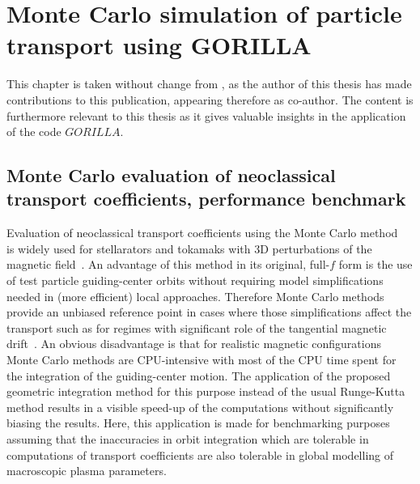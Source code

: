 \documentclass[./main.tex]{subfiles}
\begin{document}
\chapter{Monte Carlo simulation of particle transport using GORILLA}
This chapter is taken without change from \cite{paper_gorilla}, as the author of this thesis has made contributions to this publication, appearing therefore as co-author. The content is furthermore relevant to this thesis as it gives valuable insights in the application of the code $GORILLA$.
\section{Monte Carlo evaluation of neoclassical transport coefficients, performance benchmark}
\label{sec:transport}


Evaluation of neoclassical transport coefficients using the Monte Carlo
method~\cite{boozer_monte_1981,lotz_monte_1988} is widely
used for stellarators and tokamaks with 3D perturbations of the magnetic
field~\cite{wakasa_study_2008,tribaldos_monte_2001,isaev_venusf_2006,allmaier_variance_2008,velasco_calculation_2011,satake_neoclassical_2011,pfefferle_venus-levis_2014}.
An advantage of this method in its original, full-$f$ form is the use of test particle guiding-center
orbits without requiring model simplifications needed in (more efficient) local approaches. Therefore Monte Carlo methods provide
an unbiased reference point in cases where those simplifications affect the transport such as for regimes with
significant role of the tangential magnetic drift~\cite{matsuoka_effects_2015,huang_benchmark_2017}.
An obvious disadvantage is that for realistic magnetic configurations Monte Carlo methods are CPU-intensive
with most of the CPU time spent for the integration of the guiding-center motion. The application of the proposed geometric integration method for this purpose instead of the usual Runge-Kutta method results in a visible speed-up
of the computations without significantly biasing the results.
Here, this application is made for benchmarking purposes assuming that the inaccuracies in orbit integration
which are tolerable in computations of transport coefficients are also tolerable
in global modelling of macroscopic plasma parameters.
\end{document}
